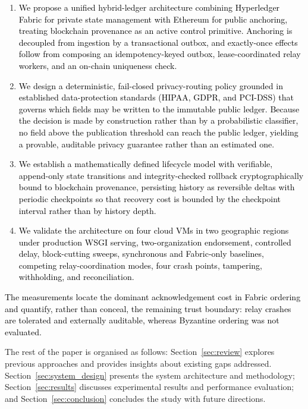\documentclass[final,5p,times,twocolumn]{elsarticle}
\begin{document}
\begin{enumerate}
    \item \textcolor{black}{We propose a unified hybrid-ledger architecture combining Hyperledger Fabric
    for private state management with Ethereum for public anchoring, treating blockchain
    provenance as an active control primitive. Anchoring is decoupled from ingestion by a
    transactional outbox, and exactly-once effects follow from composing an
    idempotency-keyed outbox, lease-coordinated relay workers, and an on-chain uniqueness check.}
    \item \textcolor{black}{We design a deterministic, fail-closed privacy-routing policy grounded in
    established data-protection standards (HIPAA, GDPR, and PCI-DSS) that governs which
    fields may be written to the immutable public ledger. Because the decision is made by
    construction rather than by a probabilistic classifier, no field above the publication
    threshold can reach the public ledger, yielding a provable, auditable privacy
    guarantee rather than an estimated one.}
    \item \textcolor{black}{We establish a mathematically defined lifecycle model with verifiable,
    append-only state transitions and integrity-checked rollback cryptographically bound
    to blockchain provenance, persisting history as reversible deltas with periodic
    checkpoints so that recovery cost is bounded by the checkpoint interval rather than by
    history depth.}
    \item \textcolor{black}{We validate the architecture on four cloud VMs in two geographic regions under production WSGI serving, two-organization endorsement, controlled delay, block-cutting sweeps, synchronous and Fabric-only baselines, competing relay-coordination modes, four crash points, tampering, withholding, and reconciliation.}
\end{enumerate}
\textcolor{black}{The measurements locate the dominant acknowledgement cost in Fabric ordering and quantify, rather than conceal, the remaining trust boundary: relay crashes are tolerated and externally auditable, whereas Byzantine ordering was not evaluated.}

The rest of the paper is organised as follows: Section~\ref{sec:review} explores previous approaches and provides insights about existing gaps addressed. Section~\ref{sec:system_design} presents the system architecture and methodology; Section~\ref{sec:results} discusses experimental results and performance evaluation; and Section~\ref{sec:conclusion} concludes the study with future directions.
\end{document}
